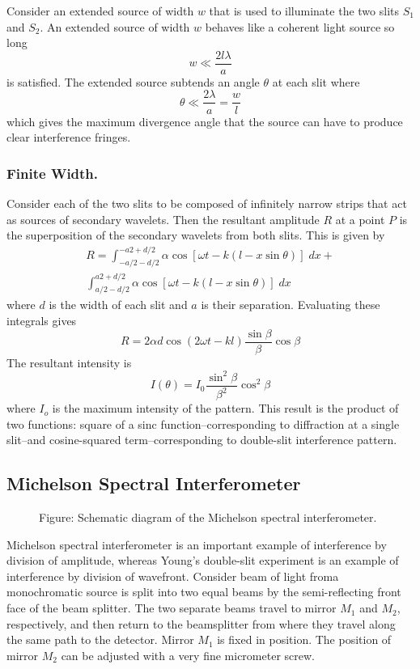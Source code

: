 \documentclass[../../../main.tex]{subfiles}
\begin{document}
Consider an extended source of width $w$ that is used to illuminate the two slits $S_1$ and $S_2$.  An extended source of width $w$ behaves like a coherent light source so long
\begin{equation*}
    w\ll \frac{2l\lambda}{a}
\end{equation*}
is satisfied. The extended source subtends an angle $\theta$ at each slit where
\begin{equation*}
    \theta\ll \frac{2\lambda}{a}=\frac{w}{l}
\end{equation*}
which gives the maximum divergence angle that the source can have to produce clear interference fringes.

\subsubsection*{Finite Width.} Consider each of the two slits to be composed of infinitely narrow strips that act as sources of secondary wavelets. Then the resultant amplitude $R$ at a point $P$ is the superposition of the secondary wavelets from both slits. This is given by
\begin{multline*}
    R=\int_{-a/2-d/2}^{-a2+d/2}\alpha \cos[\omega t- k(l-x\sin \theta)]\;dx+\\ \int_{a/2-d/2}^{a2+d/2}\alpha \cos[\omega t- k(l-x\sin \theta)]\;dx
\end{multline*}
where $d$ is the width of each slit and $a$ is their separation. Evaluating these integrals gives
\begin{equation*}
    R=2\alpha d \cos(2\omega t - kl)\frac{\sin \beta}{\beta}\cos \beta
\end{equation*}
The resultant intensity is
\begin{equation*}
    I(\theta)=I_0\frac{\sin^2 \beta}{\beta^2}\cos^2 \beta
\end{equation*}
where $I_o$ is the maximum intensity of the pattern. This result is the product of two functions: square of a sinc function--corresponding to diffraction at a single slit--and cosine-squared term--corresponding to double-slit interference pattern.

\subsection*{Michelson Spectral Interferometer}
\begin{figure*}
    \centering
    \caption*{Figure: Schematic diagram of the Michelson spectral interferometer.}
\end{figure*}
Michelson spectral interferometer is an important example of interference by division of amplitude, whereas Young's double-slit experiment is an example of interference by division of wavefront. Consider beam of light froma monochromatic source is split into two equal beams by the semi-reﬂecting front face of the beam splitter. The two separate beams travel to mirror $M_1$ and $M_2$, respectively, and then return to the beamsplitter from where they travel along the same path to the detector. Mirror $M_1$ is ﬁxed in position. The position of mirror $M_2$ can be adjusted with a very ﬁne micrometer screw. 
\end{document}
